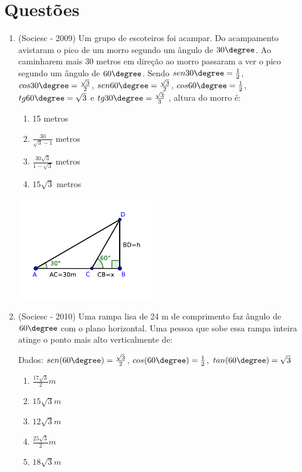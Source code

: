  \section{Questões}
\begin{enumerate}
 \item (Sociesc - 2009) Um grupo de escoteiros foi acampar. Do acampamento avistaram o pico de um morro segundo um ângulo de $30 \degree$. Ao caminharem mais 30 metros em direção ao morro passaram a ver o pico segundo um ângulo de $60 \degree$. Sendo $sen 30\degree = \frac{1}{2}$, $cos 30\degree =\frac{\sqrt{3}}{2}$, $sen 60\degree =\frac{\sqrt{3}}{2}$, $cos 60\degree =\frac{1}{2}$, $tg 60\degree = \sqrt{3}$ e $tg 30\degree =\frac{\sqrt{3}}{3}$ , altura do morro é:
 \begin{multicols}{2}
 
 \begin{enumerate}
  \item 15 metros
  \item $\frac{30}{\sqrt{3}-1}$ metros
  \item $\frac{30\sqrt{3}}{1-\sqrt{3}}$ metros
  \item $15\sqrt{3}$ metros
 \end{enumerate}
 
 \includegraphics[width=6cm]{../../Topicos/Figuras/tri_ret_exer.pdf} 
 
 \end{multicols}
 
 \item (Sociesc - 2010) Uma rampa lisa de 24 m de comprimento faz ângulo de $60\degree$ com o plano horizontal. Uma pessoa que sobe essa rampa inteira atinge o ponto mais alto verticalmente de:
  
  Dados: $sen (60\degree)= \frac{\sqrt{3}}{2}$, $cos (60\degree)= \frac{1}{2}$, $tan (60\degree)= \sqrt{3}$
 \begin{multicols}{2}
 
 \begin{enumerate}
  \item $\frac{17 \sqrt{3}}{2} m$
  \item $15\sqrt{3} m$
  \item $12\sqrt{3} m$
  \item $\frac{25 \sqrt{3}}{2} m$
  \item $18\sqrt{3} m$
 \end{enumerate} 
 

\end{multicols}
\end{enumerate}
